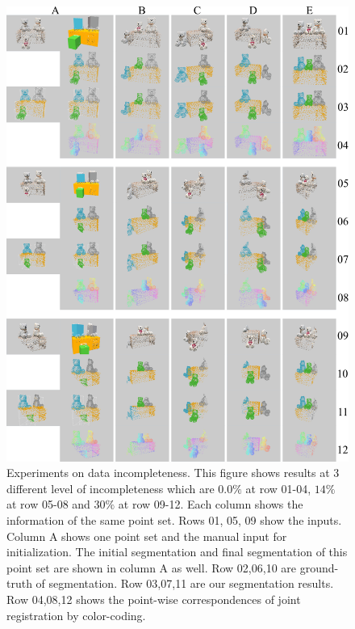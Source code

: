 \begin{figure}
	\centering
	\includegraphics[width=\linewidth]{images/incompleteness/visual}
	\caption{Experiments on data incompleteness. This figure shows results at 3 different level of incompleteness which are $0.0\%$ at row 01-04, $14\%$ at row 05-08 and $30\%$ at row 09-12. Each column shows the information of the same point set. Rows 01, 05, 09 show the inputs. 
		Column A shows one point set and the manual input for initialization. 
		The initial segmentation and final segmentation of this point set are shown in column A as well.
		Row 02,06,10 are ground-truth of segmentation. Row 03,07,11 are our segmentation results. 
		Row 04,08,12 shows the point-wise correspondences of joint registration by color-coding.}
	\label{fig:incompleteness2}
\end{figure}
